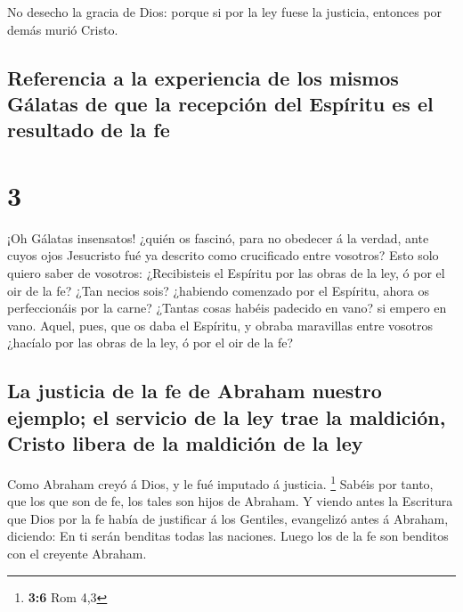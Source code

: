  No desecho la gracia de Dios: porque si por la ley fuese
la justicia, entonces por demás murió Cristo.

\hypertarget{referencia-a-la-experiencia-de-los-mismos-guxe1latas-de-que-la-recepciuxf3n-del-espuxedritu-es-el-resultado-de-la-fe}{%
\subsection{Referencia a la experiencia de los mismos Gálatas de que la
recepción del Espíritu es el resultado de la
fe}\label{referencia-a-la-experiencia-de-los-mismos-guxe1latas-de-que-la-recepciuxf3n-del-espuxedritu-es-el-resultado-de-la-fe}}

\hypertarget{section-2}{%
\section{3}\label{section-2}}

 ¡Oh Gálatas insensatos! ¿quién os fascinó, para no obedecer
á la verdad, ante cuyos ojos Jesucristo fué ya descrito como crucificado
entre vosotros?  Esto solo quiero saber de vosotros:
¿Recibisteis el Espíritu por las obras de la ley, ó por el oir de la fe?
 ¿Tan necios sois? ¿habiendo comenzado por el Espíritu,
ahora os perfeccionáis por la carne?  ¿Tantas cosas habéis
padecido en vano? si empero en vano.  Aquel, pues, que os
daba el Espíritu, y obraba maravillas entre vosotros ¿hacíalo por las
obras de la ley, ó por el oir de la fe?

\hypertarget{la-justicia-de-la-fe-de-abraham-nuestro-ejemplo-el-servicio-de-la-ley-trae-la-maldiciuxf3n-cristo-libera-de-la-maldiciuxf3n-de-la-ley}{%
\subsection{La justicia de la fe de Abraham nuestro ejemplo; el servicio
de la ley trae la maldición, Cristo libera de la maldición de la
ley}\label{la-justicia-de-la-fe-de-abraham-nuestro-ejemplo-el-servicio-de-la-ley-trae-la-maldiciuxf3n-cristo-libera-de-la-maldiciuxf3n-de-la-ley}}

 Como Abraham creyó á Dios, y le fué imputado á justicia.
\footnote{\textbf{3:6} Rom 4,3}  Sabéis por tanto, que los
que son de fe, los tales son hijos de Abraham.  Y viendo
antes la Escritura que Dios por la fe había de justificar á los
Gentiles, evangelizó antes á Abraham, diciendo: En ti serán benditas
todas las naciones.  Luego los de la fe son benditos con el
creyente Abraham.

